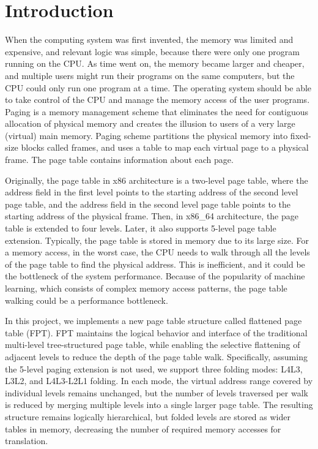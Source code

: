 \section{Introduction}
\label{sec:introduction}

When the computing system was first invented, the memory was limited and expensive, and relevant logic was simple, because there were only one program running on the CPU. As time went on, the memory became larger and cheaper, and multiple users might run their programs on the same computers, but the CPU could only run one program at a time. The operating system should be able to take control of the CPU and manage the memory access of the user programs. Paging is a memory management scheme that eliminates the need for contiguous allocation of physical memory and creates the illusion to users of a very large (virtual) main memory. Paging scheme partitions the physical memory into fixed-size blocks called frames, and uses a table to map each virtual page to a physical frame. The page table contains information about each page.

Originally, the page table in x86 architecture is a two-level page table, where the address field in the first level points to the starting address of the second level page table, and the address field in the second level page table points to the starting address of the physical frame. Then, in x86\_64 architecture, the page table is extended to four levels. Later, it also supports 5-level page table extension. Typically, the page table is stored in memory due to its large size. For a memory access, in the worst case, the CPU needs to walk through all the levels of the page table to find the physical address. This is inefficient, and it could be the bottleneck of the system performance. Because of the popularity of machine learning, which consists of complex memory access patterns, the page table walking could be a performance bottleneck.

In this project, we implements a new page table structure called flattened page table (FPT). FPT maintains the logical behavior and interface of the traditional multi-level tree-structured page table, while enabling the selective flattening of adjacent levels to reduce the depth of the page table walk. Specifically, assuming the 5-level paging extension is not used, we support three folding modes: L4L3, L3L2, and L4L3-L2L1 folding. In each mode, the virtual address range covered by individual levels remains unchanged, but the number of levels traversed per walk is reduced by merging multiple levels into a single larger page table. The resulting structure remains logically hierarchical, but folded levels are stored as wider tables in memory, decreasing the number of required memory accesses for translation. %
